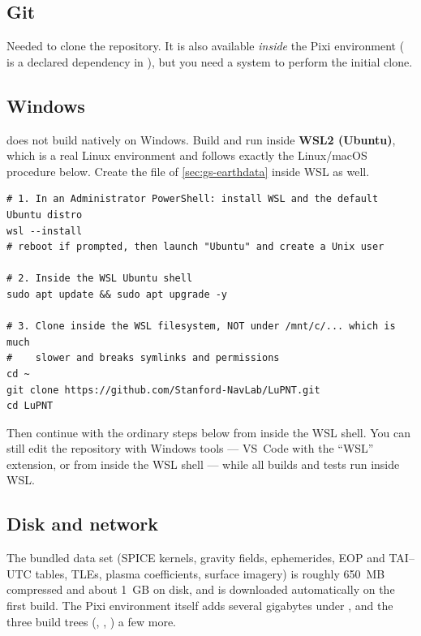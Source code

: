 \subsection{Git}

Needed to clone the repository. It is also available \emph{inside} the Pixi
environment ( is a declared dependency in ), but you
need a system  to perform the initial clone.

\subsection{Windows}

\lupnt{} does not build natively on Windows. Build and run inside
\textbf{WSL2 (Ubuntu)}, which is a real Linux environment and follows exactly
the Linux/macOS procedure below. Create the  file of
\cref{sec:gs-earthdata} inside WSL as well.

\begin{lstlisting}[language=shell]
# 1. In an Administrator PowerShell: install WSL and the default Ubuntu distro
wsl --install
# reboot if prompted, then launch "Ubuntu" and create a Unix user

# 2. Inside the WSL Ubuntu shell
sudo apt update && sudo apt upgrade -y

# 3. Clone inside the WSL filesystem, NOT under /mnt/c/... which is much
#    slower and breaks symlinks and permissions
cd ~
git clone https://github.com/Stanford-NavLab/LuPNT.git
cd LuPNT
\end{lstlisting}

Then continue with the ordinary steps below from inside the WSL shell. You can
still edit the repository with Windows tools --- VS~Code with the ``WSL''
extension, or  from inside the WSL shell --- while all builds and
tests run inside WSL.

\subsection{Disk and network}

The bundled data set (SPICE kernels, gravity fields, ephemerides, EOP and
TAI--UTC tables, TLEs, plasma coefficients, surface imagery) is roughly
650~MB compressed and about 1~GB on disk, and is downloaded automatically on
the first build. The Pixi environment itself adds several gigabytes under
, and the three build trees (, ,
) a few more.

